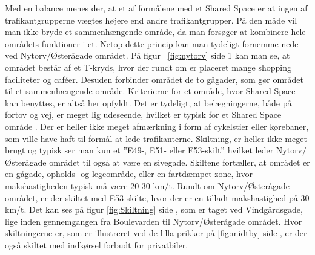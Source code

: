 Med en balance menes der, at et af formålene med et Shared Space er at ingen af trafikantgrupperne vægtes højere end andre trafikantgrupper. På den måde vil man ikke bryde et sammenhængende område, da man forsøger at kombinere hele områdets funktioner i et. Netop dette princip kan man tydeligt fornemme nede ved Nytorv/Østerågade området.  På figur ~\cref{fig:nytorv} side \pageref*{fig:nytorv} 1 kan man se, at området består af et T-kryds, hvor der rundt om er placeret mange shopping faciliteter og caféer. Desuden forbinder området de to gågader, som gør området til et sammenhængende område. Kriterierne for et område, hvor Shared Space kan benyttes, er altså her opfyldt.
Det er tydeligt, at belægningerne, både på fortov og vej, er meget lig udeseende, hvilket er typisk for et Shared Space område . Der er heller ikke meget afmærkning i form af cykelstier eller kørebaner, som ville have haft til formål at lede trafikanterne. Skiltning, er heller ikke meget brugt og typisk ser man kun et ”E49-, E51- eller E53-skilt” hvilket leder Nytorv/Østerågade området til også at være en sivegade. Skiltene fortæller, at området er en gågade, opholds- og legeområde, eller en fartdæmpet zone, hvor makshastigheden typisk må være 20-30 km/t.  Rundt om Nytorv/Østerågade området, er der skiltet med E53-skilte, hvor der er en tilladt makshastighed på 30 km/t. Det kan ses på figur \cref{fig:Skiltning} side \pageref{fig:Skiltning}, som er taget ved Vindgårdsgade, lige inden gennemgangen fra Boulevarden til Nytorv/Østerågade området. Hvor skiltningerne er, som er illustreret ved de lilla prikker på \cref{fig:midtby} side \pageref{fig:midtby}, er der også skiltet med indkørsel forbudt for privatbiler. 

